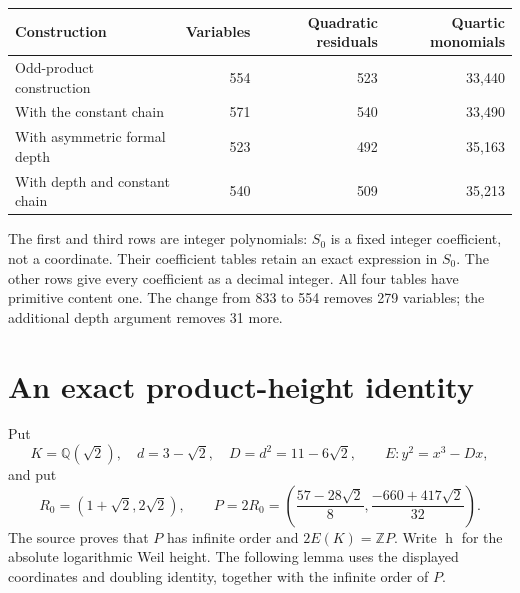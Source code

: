 \documentclass[11pt]{article}
\newcommand{\Q}{\mathbb Q}
\newcommand{\Z}{\mathbb Z}
\newcommand{\htw}{\operatorname h}
\begin{document}
\begin{center}
\begin{tabular}{lrrr}
\toprule
Construction & Variables & Quadratic residuals & Quartic monomials\\
\midrule
Odd-product construction & 554 & 523 & 33,440\\
With the constant chain & 571 & 540 & 33,490\\
With asymmetric formal depth & 523 & 492 & 35,163\\
With depth and constant chain & 540 & 509 & 35,213\\
\bottomrule
\end{tabular}
\end{center}

The first and third rows are integer polynomials: $S_0$ is a fixed integer coefficient, not a coordinate. Their coefficient tables retain an exact expression in $S_0$. The other rows give every coefficient as a decimal integer. All four tables have primitive content one. The change from 833 to 554 removes 279 variables; the additional depth argument removes 31 more.

\section{An exact product-height identity}\label{sec:height}
Put
\[
 K=\Q(\sqrt2),\quad d=3-\sqrt2,\quad D=d^2=11-6\sqrt2,
 \qquad E:y^2=x^3-Dx,
\]
and put
\[
 R_0=(1+\sqrt2,2\sqrt2),\qquad
 P=2R_0=\left(\frac{57-28\sqrt2}{8},\frac{-660+417\sqrt2}{32}\right).
\]
The source proves that $P$ has infinite order and $2E(K)=\Z P$. Write $\htw$ for the absolute logarithmic Weil height. The following lemma uses the displayed coordinates and doubling identity, together with the infinite order of $P$.
\end{document}
